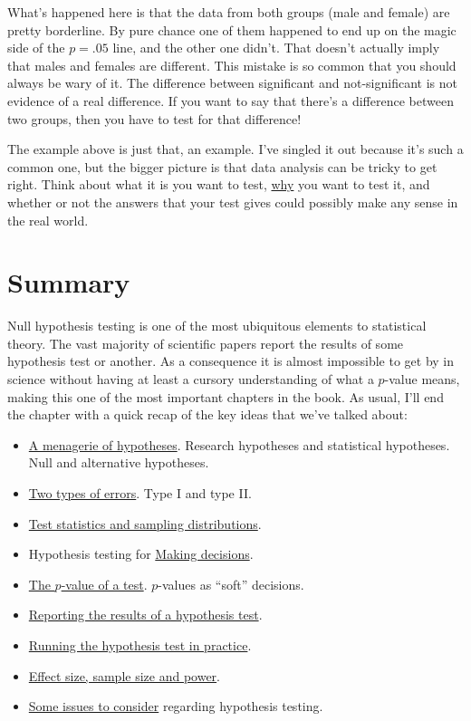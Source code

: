 \documentclass[
  a4paper,
]{book}
\providecommand{\tightlist}{%
  \setlength{\itemsep}{0pt}\setlength{\parskip}{0pt}}
\begin{document}
What's happened here is that the data from both groups (male and female)
are pretty borderline. By pure chance one of them happened to end up on
the magic side of the \(p = .05\) line, and the other one didn't. That
doesn't actually imply that males and females are different. This
mistake is so common that you should always be wary of it. The
difference between significant and not-significant is not evidence of a
real difference. If you want to say that there's a difference between
two groups, then you have to test for that difference!

The example above is just that, an example. I've singled it out because
it's such a common one, but the bigger picture is that data analysis can
be tricky to get right. Think about what it is you want to test,
\ul{why} you want to test it, and whether or not the answers that your
test gives could possibly make any sense in the real world.

\section{Summary}\label{summary}

Null hypothesis testing is one of the most ubiquitous elements to
statistical theory. The vast majority of scientific papers report the
results of some hypothesis test or another. As a consequence it is
almost impossible to get by in science without having at least a cursory
understanding of what a \(p\)-value means, making this one of the most
important chapters in the book. As usual, I'll end the chapter with a
quick recap of the key ideas that we've talked about:

\begin{itemize}
\tightlist
\item
  \hyperref[a-menagerie-of-hypotheses]{A menagerie of hypotheses}.
  Research hypotheses and statistical hypotheses. Null and alternative
  hypotheses.
\item
  \hyperref[two-types-of-errors]{Two types of errors}. Type I and type
  II.
\item
  \hyperref[test-statistics-and-sampling-distributions]{Test statistics
  and sampling distributions}.
\item
  Hypothesis testing for \hyperref[making-decisions]{Making decisions}.
\item
  \hyperref[sec-The-p-value-of-a-test]{The \(p\)-value of a test}.
  \(p\)-values as ``soft'' decisions.
\item
  \hyperref[reporting-the-results-of-a-hypothesis-test]{Reporting the
  results of a hypothesis test}.
\item
  \hyperref[running-the-hypothesis-test-in-practice]{Running the
  hypothesis test in practice}.
\item
  \hyperref[sec-Effect-size-sample-size-and-power]{Effect size, sample
  size and power}.
\item
  \hyperref[some-issues-to-consider]{Some issues to consider} regarding
  hypothesis testing.
\end{itemize}
\end{document}
